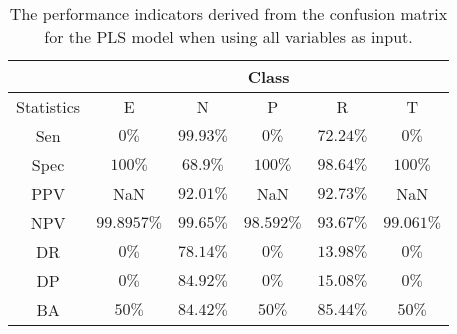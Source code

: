 \begin{table}[!ht]
	\centering
	\begin{tabular}{|c|c|c|c|c|c|}
		\hline
		 & \multicolumn{5}{c|}{Class} \\ \hline
		Statistics & E & N & P & R & T \\ \hline
		Sen & $0\%$ & $99.93\%$ & $0\%$ & $72.24\%$ & $0\%$ \\ \hline
		Spec & $100\%$ & $68.9\%$ & $100\%$ & $98.64\%$ & $100\%$ \\ \hline
		PPV & NaN & $92.01\%$ & NaN & $92.73\%$ & NaN \\ \hline
		NPV & $99.8957\%$ & $99.65\%$ & $98.592\%$ & $93.67\%$ & $99.061\%$ \\ \hline
		DR & $0\%$ & $78.14\%$ & $0\%$ & $13.98\%$ & $0\%$ \\ \hline
		DP & $0\%$ & $84.92\%$ & $0\%$ & $15.08\%$ & $0\%$ \\ \hline
		BA & $50\%$ & $84.42\%$ & $50\%$ & $85.44\%$ & $50\%$ \\ \hline
	\end{tabular}
	\caption{The performance indicators derived from the confusion matrix for the PLS model when using all variables as input.}
	\label{tab:cs:reverse:all:pls}
\end{table}
